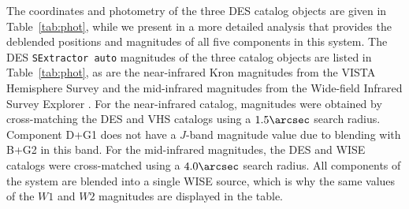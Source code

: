 \documentclass[twocolumn]{aastex6}
\begin{document}
The coordinates and photometry of the three DES catalog objects are given in
Table~\ref{tab:phot}, while we present in \cite{agn17}
a more detailed analysis that provides the deblended positions and magnitudes
of all five components in this system.
The DES {\tt SExtractor auto} magnitudes of the three catalog objects
are listed in Table~\ref{tab:phot}, as are the near-infrared Kron magnitudes
\citep{kron80} from the VISTA Hemisphere Survey \citep[VHS;][]{mcmahon13} 
and the mid-infrared magnitudes from the Wide-field Infrared Survey Explorer 
\citep[WISE;][]{wright10}.
For the near-infrared catalog, magnitudes were obtained by cross-matching the
DES and VHS catalogs using a $1.5\arcsec$ search radius. 
Component D+G1 does not have a $J$-band magnitude value due to blending with
B+G2 in this band.  
For the mid-infrared magnitudes, the DES and WISE catalogs were cross-matched 
using a $4.0\arcsec$ search radius. 
All components of the system are blended into a single WISE source, which is 
why the same values of the $W1$ and $W2$ magnitudes are displayed in the table.
\end{document}
